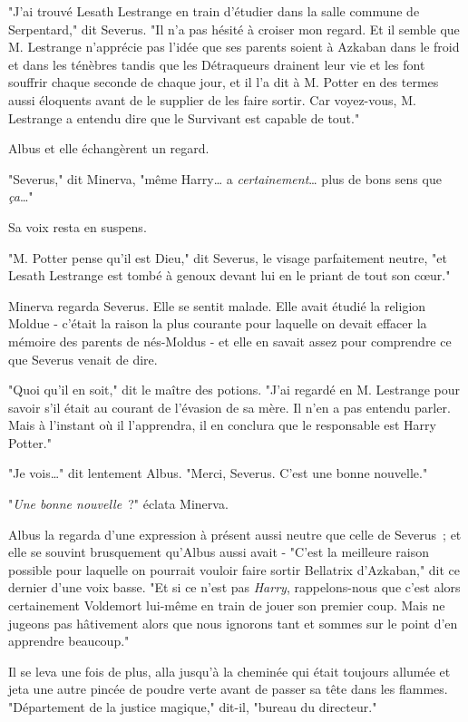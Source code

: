"J'ai trouvé Lesath Lestrange en train d'étudier dans la salle commune de Serpentard," dit Severus. "Il n'a pas hésité à croiser mon regard. Et il semble que M. Lestrange n'apprécie pas l'idée que ses parents soient à Azkaban dans le froid et dans les ténèbres tandis que les Détraqueurs drainent leur vie et les font souffrir chaque seconde de chaque jour, et il l'a dit à M. Potter en des termes aussi éloquents avant de le supplier de les faire sortir. Car voyez-vous, M. Lestrange a entendu dire que le Survivant est capable de tout."

Albus et elle échangèrent un regard.

"Severus," dit Minerva, "même Harry… a \emph{certainement}… plus de bons sens que \emph{ça}…"

Sa voix resta en suspens.

"M. Potter pense qu'il est Dieu," dit Severus, le visage parfaitement neutre, "et Lesath Lestrange est tombé à genoux devant lui en le priant de tout son cœur."

Minerva regarda Severus. Elle se sentit malade. Elle avait étudié la religion Moldue - c'était la raison la plus courante pour laquelle on devait effacer la mémoire des parents de nés-Moldus - et elle en savait assez pour comprendre ce que Severus venait de dire.

"Quoi qu'il en soit," dit le maître des potions. "J'ai regardé en M. Lestrange pour savoir s'il était au courant de l'évasion de sa mère. Il n'en a pas entendu parler. Mais à l'instant où il l'apprendra, il en conclura que le responsable est Harry Potter."

"Je vois…" dit lentement Albus. "Merci, Severus. C'est une bonne nouvelle."

"\emph{Une bonne nouvelle}~?" éclata Minerva.

Albus la regarda d'une expression à présent aussi neutre que celle de Severus~; et elle se souvint brusquement qu'Albus aussi avait - "C'est la meilleure raison possible pour laquelle on pourrait vouloir faire sortir Bellatrix d'Azkaban," dit ce dernier d'une voix basse. "Et si ce n'est pas \emph{Harry}, rappelons-nous que c'est alors certainement Voldemort lui-même en train de jouer son premier coup. Mais ne jugeons pas hâtivement alors que nous ignorons tant et sommes sur le point d'en apprendre beaucoup."

Il se leva une fois de plus, alla jusqu'à la cheminée qui était toujours allumée et jeta une autre pincée de poudre verte avant de passer sa tête dans les flammes. "Département de la justice magique," dit-il, "bureau du directeur."

